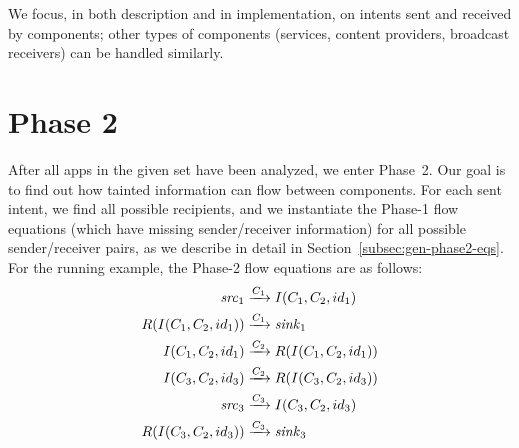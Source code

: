 We focus, in both description and in implementation, on intents sent and
received by  components; other types of components (services,
content providers, broadcast receivers) can be handled similarly.

\section{Phase 2} \label{sec:phase2}
After all apps in the given set have been analyzed, we enter Phase~2.
Our goal is to find out how tainted information can flow between components.
For each sent intent, we find all possible recipients, and
we instantiate the Phase-1 flow
equations (which have missing sender/receiver information) for all
possible sender/receiver pairs, as we describe in detail in
Section~\ref{subsec:gen-phase2-eqs}.
For the running example, the Phase-2 flow equations are as follows:
\begin{align*}
\mathit{src}_1 & \xrightarrow{C_1} I(C_1, C_2, id_1)
\\
R(I(C_1, C_2, id_1)) & \xrightarrow{C_1} \mathit{sink}_1
\\
I(C_1, C_2, id_1) & \xrightarrow{C_2} R(I(C_1, C_2, id_1))
\\
I(C_3, C_2, id_3) & \xrightarrow{C_2} R(I(C_3, C_2, id_3))
\\
\mathit{src}_3 & \xrightarrow{C_3} I(C_3, C_2, id_3)
\\
R(I(C_3, C_2, id_3)) & \xrightarrow{C_3} \mathit{sink}_3
\end{align*}

